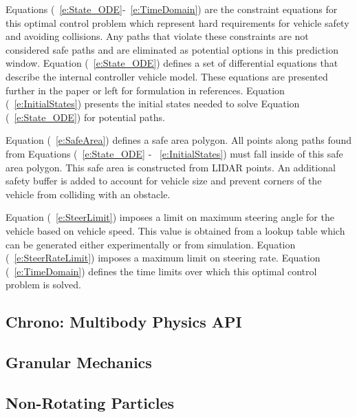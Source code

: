 \documentclass[12pt,twocolumn]{article}
\begin{document}
Equations (~\ref{e:State_ODE}-~\ref{e:TimeDomain}) are the constraint equations for this optimal control problem which represent hard requirements for vehicle safety and avoiding collisions. Any paths that violate these constraints are not considered safe paths and are eliminated as potential options in this prediction window. Equation (~\ref{e:State_ODE}) defines a set of differential equations that describe the internal controller vehicle model. These equations are presented further in the paper or left for formulation in references. Equation (~\ref{e:InitialStates}) presents the initial states needed to solve Equation (~\ref{e:State_ODE}) for potential paths. 

Equation (~\ref{e:SafeArea}) defines a safe area polygon. All points along paths found from Equations (~\ref{e:State_ODE} - ~\ref{e:InitialStates}) must fall inside of this safe area polygon. This safe area is constructed from LIDAR points. An additional safety buffer is added to account for vehicle size and prevent corners of the vehicle from colliding with an obstacle. 

Equation (~\ref{e:SteerLimit}) imposes a limit on maximum steering angle for the vehicle based on vehicle speed. This value is obtained from a lookup table which can be generated either experimentally or from simulation. Equation (~\ref{e:SteerRateLimit}) imposes a maximum limit on steering rate. Equation (~\ref{e:TimeDomain}) defines the time limits over which this optimal control problem is solved.


\subsection{Chrono: Multibody Physics API }\label{ss:Chrono}


\subsection{Granular Mechanics }\label{ss:GranMech}


\subsection{Non-Rotating Particles}\label{ss:NonRot}
\end{document}
